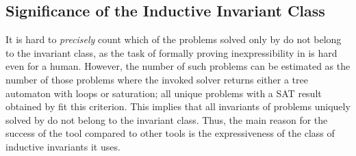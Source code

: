 \subsection{Significance of the Inductive Invariant Class}

It is hard to \emph{precisely} count which of the problems solved only by \theringenCICI{} do not belong to the \elemclass{} invariant class, as the task of formally proving inexpressibility in \elemclass{} is hard even for a human. However, the number of such problems can be estimated as the number of those problems where the invoked solver returns either a tree automaton with loops or saturation; all unique problems with a SAT result obtained by \theringenCICI{} fit this criterion. This implies that all invariants of problems uniquely solved by \theringenCICI{} do not belong to the \elemclass{} invariant class. Thus, the main reason for the success of the \theringenCICI{} tool compared to other tools is the expressiveness of the class of inductive invariants it uses.

